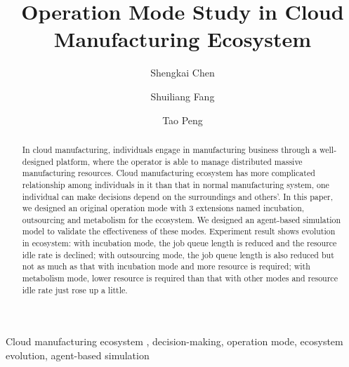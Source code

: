 
\title{Operation Mode Study in Cloud Manufacturing Ecosystem
}

\author[add1]{Shengkai Chen}
\author[add2,add1]{Shuiliang Fang}
\author[add2,add1]{Tao Peng}
\address[add2]{The State Key Laboratory of Fluid Power Transmission and Control, College of Mechanical Engineering, Zhejiang University, Hangzhou, 310027, China}
\address[add1]{Key Laboratory of Advanced Manufacturing Technology of Zhejiang Province, College of Mechanical Engineering, Zhejiang University, Hangzhou , 310027, China}



\begin{abstract}
In cloud manufacturing, individuals engage in manufacturing business through a well-designed platform, where the operator is able to manage distributed massive manufacturing resources.
Cloud manufacturing ecosystem has more complicated relationship among individuals in it than that in normal manufacturing system, one individual can make decisions depend on the surroundings and others'. In this paper, we designed an original operation mode with 3 extensions named incubation, outsourcing and metabolism for the ecosystem. We designed an agent-based simulation model to validate the effectiveness of these modes. Experiment result shows evolution in ecosystem: with incubation mode, the job queue length is reduced and the resource idle rate is declined; with outsourcing mode, the job queue length is also reduced but not as much as that with incubation mode and more resource is required; with metabolism mode, lower resource is required than that with other modes and resource idle rate just rose up a little.

\end{abstract}

\begin{keyword}
Cloud manufacturing ecosystem \sep
decision-making\sep
operation mode\sep
ecosystem evolution\sep
agent-based simulation

\end{keyword}
